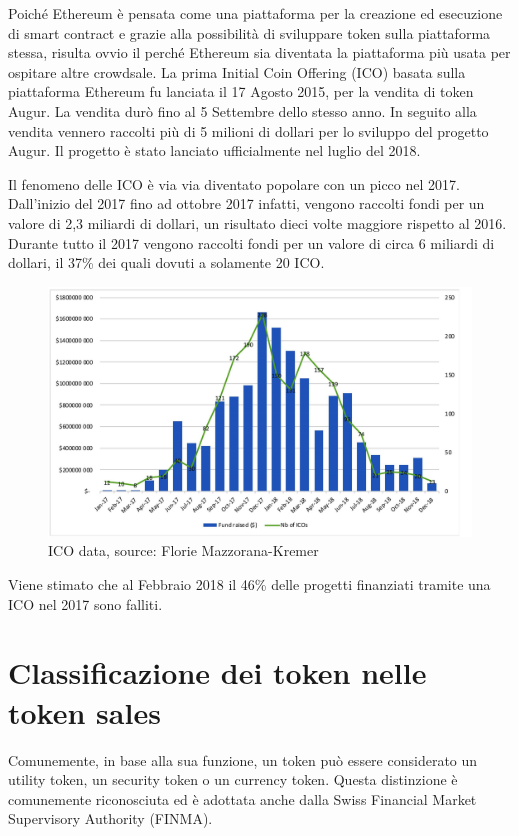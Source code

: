 Poiché Ethereum è pensata come una piattaforma per la creazione ed esecuzione di smart contract e grazie alla possibilità di sviluppare token sulla piattaforma stessa, risulta ovvio il perché Ethereum sia diventata la piattaforma più usata per ospitare altre crowdsale. La prima Initial Coin Offering (ICO) basata sulla piattaforma Ethereum fu lanciata il 17 Agosto 2015, per la vendita di token Augur\cite{K29}. La vendita durò fino al 5 Settembre dello stesso anno. In seguito alla vendita vennero raccolti più di 5 milioni di dollari per lo sviluppo del progetto Augur. Il progetto è stato lanciato ufficialmente nel luglio del 2018. 

Il fenomeno delle ICO è via via diventato popolare con un picco nel 2017. Dall'inizio  del 2017 fino ad ottobre 2017 infatti, vengono raccolti fondi per un valore di 2,3 miliardi di dollari, un risultato dieci volte maggiore rispetto al 2016. 
Durante tutto il 2017 vengono raccolti fondi per un valore di circa 6 miliardi di dollari, il 37\% dei quali dovuti a solamente 20 ICO. 

\begin{figure}[H]
  \includegraphics[width=\linewidth]{ico.jpg}
  \caption{ICO data, source: Florie Mazzorana-Kremer}
  \label{fig:ico}
\end{figure}

Viene stimato che al Febbraio 2018 il 46\% delle progetti finanziati tramite una ICO nel 2017 sono falliti. 

\section{Classificazione dei token nelle token sales}
Comunemente, in base alla sua funzione, un token può essere considerato un utility token, un security token o un currency token. Questa distinzione è comunemente riconosciuta ed è adottata anche dalla Swiss Financial Market Supervisory Authority (FINMA)\cite{K30}. 

